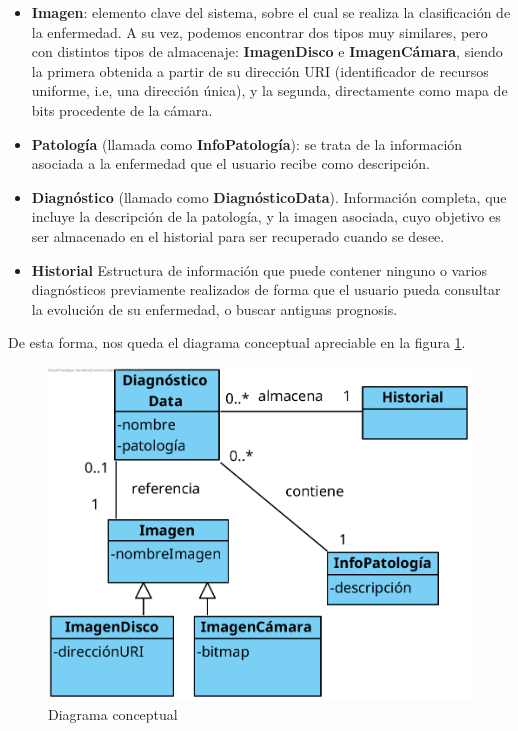\begin{itemize}
	\item \textbf{Imagen}: elemento clave del sistema, sobre el cual se realiza la clasificación de la enfermedad.  A su vez, podemos encontrar dos tipos muy similares, pero con distintos tipos de almacenaje: \textbf{ImagenDisco} e \textbf{ImagenCámara}, siendo la primera obtenida a partir de su dirección URI (identificador de recursos uniforme, i.e, una dirección única), y la segunda, directamente como mapa de bits procedente de la cámara.
	\item  \textbf{Patología} (llamada como \textbf{InfoPatología}): se trata de la información asociada a la enfermedad que el usuario recibe como descripción.
	\item \textbf{Diagnóstico} (llamado como \textbf{DiagnósticoData}). Información completa, que incluye la descripción de la patología, y la imagen asociada, cuyo objetivo es ser almacenado en el historial para ser recuperado cuando se desee.
	\item \textbf{Historial} Estructura de información que puede contener ninguno o varios diagnósticos previamente realizados de forma que el usuario pueda consultar la evolución de su enfermedad, o buscar antiguas prognosis.
\end{itemize}

De esta forma, nos queda el diagrama conceptual apreciable en la figura \ref{fig:conceptual}.

\begin{figure}[H]
	\centering
	\includegraphics[scale = 1.2]{imagenes/MapaConceptual.png}
	\caption{Diagrama conceptual}
	\label{fig:conceptual}
\end{figure}

